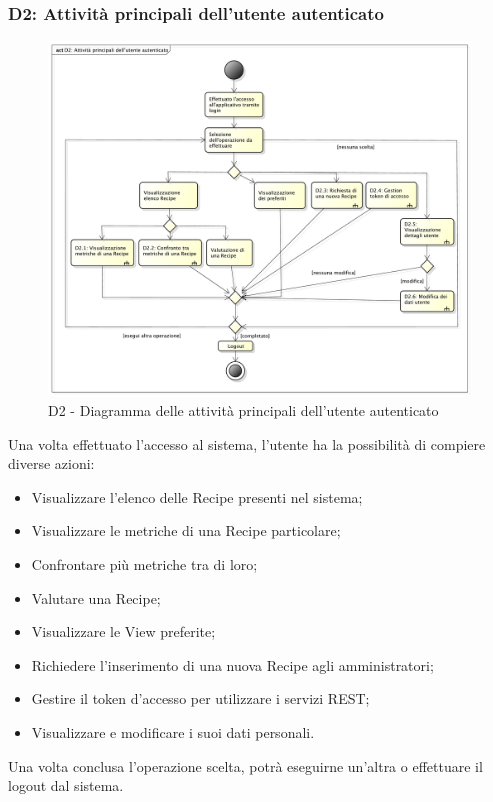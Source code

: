 		\subsubsection{D2: Attività principali dell'utente autenticato} %
		\label{ssub:attivita_principali_dell_utente_autenticato}
		\begin{figure}[!htbp]
			\centering
			\centerline{\includegraphics[scale=0.41]{./images/D2.pdf}}
			\caption{D2 - Diagramma delle attività principali dell'utente autenticato}
		\end{figure}
		\noindent
		Una volta effettuato l'accesso al sistema, l'utente ha la possibilità di compiere diverse azioni:
			\begin{itemize}
				\item Visualizzare l'elenco delle Recipe presenti nel sistema;
				\item Visualizzare le metriche di una Recipe particolare;
				\item Confrontare più metriche tra di loro;
				\item Valutare una Recipe;
				\item Visualizzare le View preferite;
				\item Richiedere l'inserimento di una nuova Recipe agli amministratori;
				\item Gestire il token d'accesso per utilizzare i servizi REST;
				\item Visualizzare e modificare i suoi dati personali.
			\end{itemize}
			\noindent
		Una volta conclusa l'operazione scelta, potrà eseguirne un'altra o effettuare il logout dal sistema.


